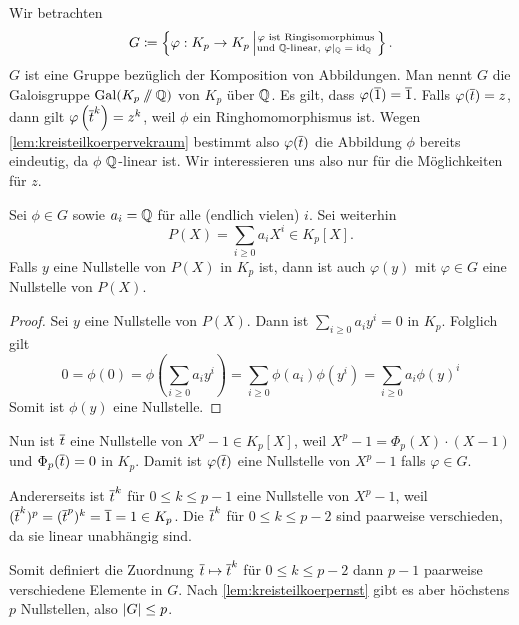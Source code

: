\documentclass[12pt,a4paper]{scrartcl}
\begin{document}
Wir betrachten 
\begin{equation*}
	G \coloneqq \left\lbrace \varphi: K_p \to K_p \left| \substack{\text{$\varphi$ ist Ringisomorphimus} \\ \text{und $\mathbb Q$-linear, $\varphi|_\mathbb Q = \operatorname{id}_\mathbb Q$ }}\right. \right\rbrace .
\end{equation*}
$G$ ist eine Gruppe bezüglich der Komposition von Abbildungen. Man nennt $G$ die Galoisgruppe $\operatorname{Gal}(K_p \sslash \mathbb Q)$ von $K_p$ über $\mathbb Q$.
Es gilt, dass $\varphi(\overline{1}) = \overline{1}$. Falls $\varphi(\overline{t}) = z$, dann gilt $\varphi\left( \overline{t} ^k \right) = z^k$, weil $\phi$ ein Ringhomomorphismus ist.
Wegen \cref{lem:kreisteilkoerpervekraum} bestimmt also $\varphi(\overline t)$ die Abbildung $\phi$ bereits eindeutig, da $\phi$ $\mathbb Q$-linear ist. Wir interessieren uns also nur für die Möglichkeiten für $z$.

\begin{lem} \label{lem:kreisteilkoerpernst}
	Sei $\phi \in G$ sowie $a_i = \mathbb Q$ für alle (endlich vielen) $i$. Sei weiterhin
	\begin{equation*}
		P(X) = \sum_{i \geq 0} a_iX^i \in K_p[X].
	\end{equation*}
	Falls $y$ eine Nullstelle von $P(X)$ in $K_p$ ist, dann ist auch $\varphi(y)$ mit $\varphi \in G$ eine Nullstelle von $P(X)$.
\end{lem}

\begin{proof}
	Sei $y$ eine Nullstelle von $P(X)$. Dann ist $\sum_{i \geq 0} a_iy^i = 0$ in $K_p$. Folglich gilt 
	$$0 = \phi(0) = \phi\left( \sum_{i \geq 0} a_iy^i \right) = \sum_{i \geq 0} \phi(a_i) \phi(y^i) = \sum_{i \geq 0} a_i \phi(y)^i$$
	Somit ist $\phi(y)$ eine Nullstelle.
\end{proof}

Nun ist $\overline t$ eine Nullstelle von $X^p-1\in K_p[X]$, weil $X^p-1=\Phi_p(X)\cdot (X-1)$ und $\Phi_p(\overline{t})=0$ in $K_p$. Damit ist $\varphi(\overline t)$ eine Nullstelle von $X^p-1$ falls $\varphi \in G$.

Andererseits ist $\overline t^k$ für $0\le k \le p-1$ eine Nullstelle von $X^p -1$, weil $(\overline t^k)^p = (\overline t ^p)^k = \overline 1 = 1 \in K_p$. Die $\overline t^k$ für $0\le k \le p-2$ sind paarweise verschieden, da sie linear unabhängig sind.

Somit definiert die Zuordnung $\overline t \mapsto \overline t^k$ für $0\le k \le p-2$ dann $p-1$ paarweise verschiedene Elemente in $G$. Nach \cref{lem:kreisteilkoerpernst} gibt es aber höchstens $p$ Nullstellen, also $\lvert G\rvert\le p$.
\end{document}
